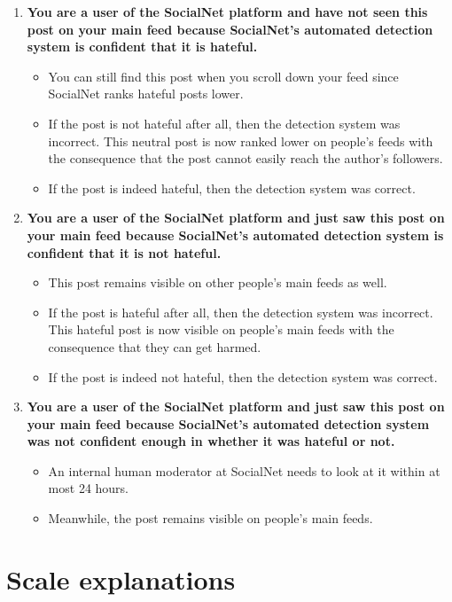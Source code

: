 \begin{enumerate}
    \item \textbf{You are a user of the SocialNet platform and have \textbf{not} seen this post on your main feed because SocialNet's automated detection system is confident that it is hateful.}
          \begin{itemize}
              \item You can still find this post when you scroll down your feed since SocialNet ranks hateful posts lower.
              \item If the post is not hateful after all, then the detection system was incorrect. This neutral post is now ranked lower on people's feeds with the consequence that the post cannot easily reach the author's followers.
              \item If the post is indeed hateful, then the detection system was correct.
          \end{itemize}
    \item \textbf{You are a user of the SocialNet platform and just saw this post on your main feed because SocialNet's automated detection system is confident that it is \textbf{not hateful}.}
          \begin{itemize}
              \item This post remains visible on other people's main feeds as well.
              \item If the post is hateful after all, then the detection system was incorrect. This hateful post is now visible on people's main feeds with the consequence that they can get harmed.
              \item If the post is indeed not hateful, then the detection system was correct.
          \end{itemize}
    \item \textbf{You are a user of the SocialNet platform and just saw this post on your main feed because SocialNet's automated detection system was not confident enough in whether it was hateful or not.}
          \begin{itemize}
              \item An internal human moderator at SocialNet needs to look at it within at most 24 hours.
              \item Meanwhile, the post remains visible on people's main feeds.
          \end{itemize}
\end{enumerate}

\section{Scale explanations}
